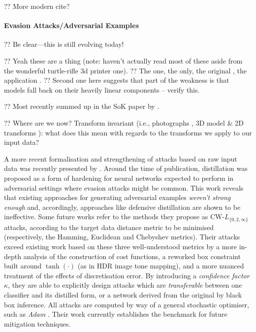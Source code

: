 ?? More modern cite?

\paragraph{Evasion Attacks/Adversarial Examples}

?? Be clear---this is still evolving today!

?? Yeah these are a thing (note: haven't actually read most of these aside from the wonderful turtle-rifle 3d printer one).
?? The one, the only, the original \parencite{DBLP:journals/corr/SzegedyZSBEGF13}, the application \parencite{DBLP:journals/corr/GoodfellowSS14}.
?? Second one here suggests that part of the weakness is that models fall back on their heavily linear components -- verify this.

?? Most recently summed up in the SoK paper by \textcite{DBLP:conf/eurosp/PapernotMSW18}.

?? Where are we now? Transform invariant (i.e., photographs \cite{DBLP:journals/corr/KurakinGB16}, 3D model \& 2D transforms \cite{DBLP:journals/corr/AthalyeS17}): what does this mean with regards to the transforms we apply to our input data?

A more recent formalisation and strengthening of attacks based on raw input data was recently presented by \textcite{DBLP:conf/sp/Carlini017}.
Around the time of publication, distillation \cite{DBLP:conf/sp/PapernotM0JS16} was proposed as a form of hardening for neural networks expected to perform in adversarial settings where evasion attacks might be common.
This work reveals that existing approaches for generating adversarial examples \emph{weren't strong enough} and, accordingly, approaches like defensive distillation are shown to be ineffective.
Some future works refer to the methods they propose as CW-$L_{\{0, 2, \infty\}}$ attacks, according to the target data distance metric to be minimised (respectively, the Hamming, Euclidean and Chebyshev metrics).
Their attacks exceed existing work based on these three well-understood metrics by a more in-depth analysis of the construction of cost functions, a reworked box constraint built around $\tanh(\cdot)$ (as in HDR image tone mapping), and a more nuanced treatment of the effects of discretisation error.
By introducing a \emph{confidence factor} $\kappa$, they are able to explicitly design attacks which are \emph{transferable} between one classifier and its distilled form, or a network derived from the original by black box inference.
All attacks are computed by way of a general stochastic optimiser, such as \emph{Adam} \cite{DBLP:journals/corr/KingmaB14}.
Their work currently establishes the benchmark for future mitigation techniques.

